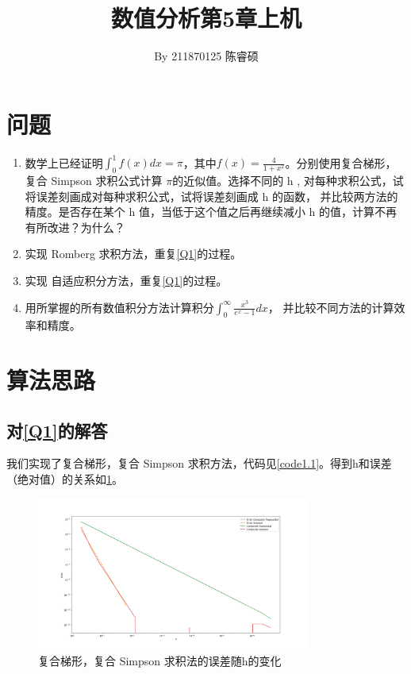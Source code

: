 \documentclass[a4paper,11pt,notitlepage]{article}
\title{\vspace{-1.5cm} \textbf{\huge{数值分析第5章上机}}\vspace{-1em}}
\author{By 211870125 陈睿硕}
\date{}
\begin{document}
\maketitle
\vspace{-1cm}
\thispagestyle{fancy}

\section{问题}
\begin{adjustwidth}{1em}{0pt}
\begin{enumerate}[label=\textbf{Q\arabic*}]
    \item 数学上已经证明$\int^{1}_{0}f(x)dx=\pi$，其中$f(x)=\frac{4}{1+x^2}$。分别使用复合梯形，复合 Simpson 求积公式计算
          $\pi$的近似值。选择不同的 h , 对每种求积公式，试将误差刻画成对每种求积公式，试将误差刻画成 h 的函数，
          并比较两方法的精度。是否存在某个 h 值，当低于这个值之后再继续减小 h 的值，计算不再有所改进？为什么？\label{Q1}\notag
    \item 实现 Romberg 求积方法，重复\ref{Q1}的过程。\label{Q2}\notag
    \item 实现 自适应积分方法，重复\ref{Q1}的过程。\label{Q3}\notag
    \item 用所掌握的所有数值积分方法计算积分$\int_{0}^{\infty}\frac{x^3}{e^x-1}dx$，
          并比较不同方法的计算效率和精度。\label{Q4}\notag
\end{enumerate}
\end{adjustwidth}

\section{算法思路}
\subsection{对\ref{Q1}的解答}
我们实现了复合梯形，复合 Simpson 求积方法，代码见\cref{code1.1}。得到h和误差（绝对值）的关系如\cref{pic:1}。
\begin{figure}[H]
    \centering
    \includegraphics[width=0.8\textwidth]{../picture/Fifth_Chapter_1A.png}
    \caption{复合梯形，复合 Simpson 求积法的误差随h的变化}
    \label{pic:1}
\end{figure}
\end{document}
